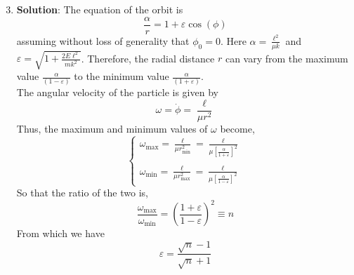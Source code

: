 \documentclass[usletter, 12pt]{article}
\begin{document}
\begin{enumerate}[leftmargin=0em, label=\textbf{\arabic*}.]
  \setcounter{enumi}{2} %


\item \textbf{Solution}: \vspace{3em}
  \noindent The equation of the orbit is
  \begin{equation}
    \frac{\alpha}{r} = 1+\varepsilon\cos(\phi)
  \end{equation}
  assuming without loss of generality that $\phi_0=0$. Here
  $\alpha=\displaystyle{\frac{\ell^2}{\mu k}}$ and $\varepsilon =
  \displaystyle{\sqrt{1+\frac{2E\ell^2}{mk^2}}}$. Therefore, the radial distance
  $r$ can vary from the maximum value $\displaystyle\frac{\alpha}{(1-\varepsilon)}$ to the minimum
  value $\displaystyle\frac{\alpha}{(1+\varepsilon)}$. \\

  \noindent The angular velocity of the particle is given by
  \begin{equation}
    \omega = \dot{\phi} = \frac{\ell}{\mu r^2}
  \end{equation}
  Thus, the maximum and minimum values of $\omega$ become,
  \begin{equation}
    \begin{cases}
      \omega_{\text{max}} = \displaystyle\frac{\ell}{\mu r_{\text{min}}^2} = \displaystyle\frac{\ell}{\mu\left[\frac{\alpha}{1+\varepsilon} \right]^2} \\ \\
      \omega_{\text{min}} = \displaystyle\frac{\ell}{\mu r_{\text{max}}^2} = \displaystyle\frac{\ell}{\mu\left[\frac{\alpha}{1-\varepsilon} \right]^2} 
    \end{cases}
  \end{equation}
  So that the ratio of the two is,
  \begin{equation}
    \frac{\omega_{\text{max}}}{\omega_{\text{min}}} = \left(  \frac{1+\varepsilon}{1-\varepsilon}\right)^2 \equiv n
  \end{equation}
  From which we have
  \begin{equation}
    \varepsilon = \frac{\sqrt{n}-1}{\sqrt{n}+1}
  \end{equation}
\newpage






\end{enumerate}
\end{document}
